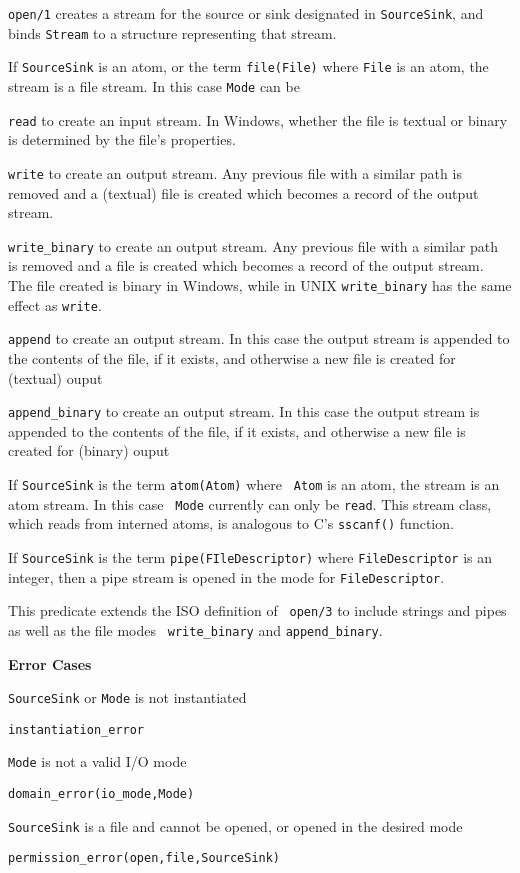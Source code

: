 \begin{description}

%
{\tt open/1} creates a stream for the source or sink designated in
{\tt SourceSink}, and binds {\tt Stream} to a structure representing
that stream.  
%
\bi
\item If {\tt SourceSink} is an atom, or the term {\tt file(File)}
where {\tt File} is an atom, the stream is a file stream.  In this
case {\tt Mode} can be 
\bi
\item {\tt read} to create an input stream.  In Windows, whether the
file is textual or binary is determined by the file's properties.
%
\item {\tt write} to create an output stream.  Any previous file with
a similar path is removed and a (textual) file is created which becomes
a record of the output stream.  
%
\item {\tt write\_binary} to create an output stream.  Any previous file with
a similar path is removed and a file is created which becomes
a record of the output stream.  The file created is binary in Windows,
while in UNIX {\tt write\_binary} has the same effect as {\tt write}.
%
\item {\tt append} to create an output stream.  In this case the
output stream is appended to the contents of the file, if it exists,
and otherwise a new file is created for (textual) ouput
%
\item {\tt append\_binary} to create an output stream.  In this case the
output stream is appended to the contents of the file, if it exists,
and otherwise a new file is created for (binary) ouput
\ei
\item If {\tt SourceSink} is the term {\tt atom(Atom)} where {\tt
Atom} is an atom, the stream is an atom stream.  In this case {\tt
Mode} currently can only be {\tt read}.  This stream class, which
reads from interned atoms, is analogous to C's {\tt sscanf()}
function.
%
\item If {\tt SourceSink} is the term {\tt pipe(FIleDescriptor)}
where {\tt FileDescriptor} is an integer, then a pipe stream is opened
in the mode for {\tt FileDescriptor}.
\ei

\compatability This predicate extends the ISO definition of {\tt
open/3} to include strings and pipes as well as the file modes {\tt
write\_binary} and {\tt append\_binary}.

{\bf Error Cases}
\bi
\item 	{\tt SourceSink} or {\tt Mode} is not instantiated
\bi
\item 	{\tt instantiation\_error}
\ei
%
\item 	{\tt Mode} is not a valid I/O mode
\bi
\item 	{\tt domain\_error(io\_mode,Mode)}
\ei
%
\item 	{\tt SourceSink} is a file and cannot be opened, or opened in
the desired mode 
\bi
\item 	{\tt permission\_error(open,file,SourceSink)}
\ei
\ei


\end{description}

